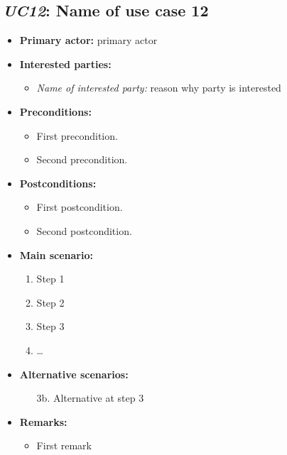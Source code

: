 \documentclass[a4paper,10pt]{article}
\begin{document}
\subsection{\emph{UC12}: Name of use case 12}
\begin{itemize}
    \item \textbf{Primary actor:} primary actor
    \item \textbf{Interested parties:} 
        \begin{itemize}
            \item \textit{Name of interested party:} reason why party is interested
        \end{itemize}

    \item \textbf{Preconditions:}
        \begin{itemize}
            \item First precondition.
            \item Second precondition.
        \end{itemize}

    \item \textbf{Postconditions:}
        \begin{itemize}
            \item First postcondition.
            \item Second postcondition.
        \end{itemize}
        
    \item \textbf{Main scenario:} 
    \begin{enumerate}
       \item Step 1
       \item Step 2
       \item Step 3
       \item \ldots
    \end{enumerate}

    \item \textbf{Alternative scenarios:} 
    \begin{enumerate}
        \item [3b.] Alternative at step 3
    \end{enumerate}
    
    \item \textbf{Remarks:}
        \begin{itemize}
            \item First remark
        \end{itemize}
\end{itemize}
\end{document}
